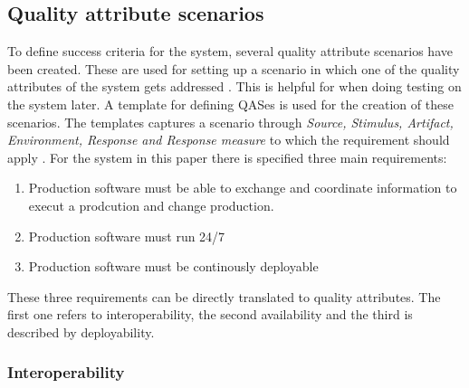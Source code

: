 \subsection{Quality attribute scenarios}
\label{sec:qas}
To define success criteria for the system, several quality attribute scenarios have been created. These are used for setting up a scenario in which one of the quality attributes of the system gets addressed \cite{bass2021software}. This is helpful for when doing testing on the system later.
A template for defining QASes is used for the creation of these scenarios. The templates captures a scenario through \textit{Source, Stimulus, Artifact, Environment, Response and Response measure} to which the requirement should apply \cite{bass2021software}. \newline
For the system in this paper there is specified three main requirements:
\begin{enumerate}
    \item Production software must be able to exchange and coordinate information to execut a prodcution and change production.
    \item Production software must run 24/7
    \item Production software must be continously deployable
\end{enumerate}
These three requirements can be directly translated to quality attributes. The first one refers to interoperability, the second availability and the third is described by deployability. \newline

\subsubsection{Interoperability}

